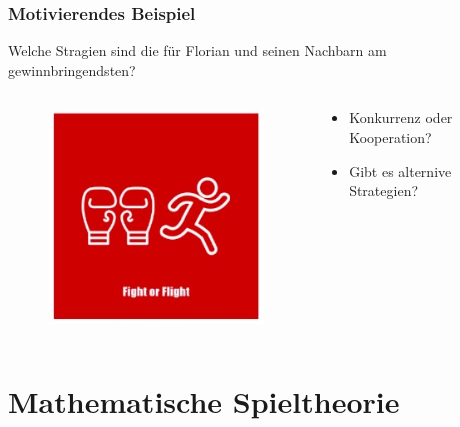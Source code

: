 \documentclass{beamer}
\begin{document}
        \begin{frame}
            \frametitle{Motivierendes Beispiel}
            Welche Stragien sind die für Florian und seinen Nachbarn am gewinnbringendsten? 
            \begin{columns}
                \begin{column}{0.25\textwidth}
                    \begin{figure}
                        \includegraphics[scale = 0.3]{images/fightOrFlight.jpg}
                    \end{figure}
                \end{column}
                \begin{column}{0.55\textwidth}
                    \begin{itemize}
                        \item Konkurrenz oder Kooperation?
                        \item Gibt es alternive Strategien?
                    \end{itemize}
                \end{column}
            \end{columns}
        \end{frame}

    \section{Mathematische Spieltheorie}
\end{document}
